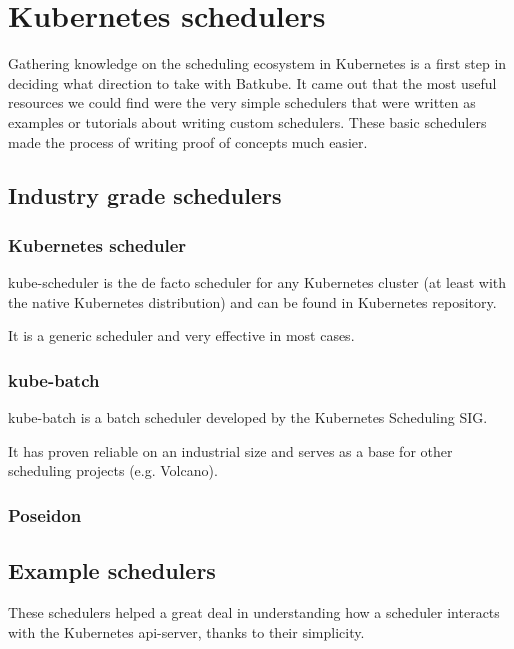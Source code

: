 \documentclass[12pt]{report}
\begin{document}
\section{Kubernetes schedulers}

Gathering knowledge on the scheduling ecosystem in Kubernetes is a first step
in deciding what direction to take with Batkube. It came out that the most
useful resources we could find were the very simple schedulers that were
written as examples or tutorials about writing custom schedulers. These basic
schedulers made the process of writing proof of concepts much easier.


\subsection{Industry grade schedulers}

\subsubsection{Kubernetes scheduler}

kube-scheduler is the de facto scheduler for any Kubernetes
cluster (at least with the native Kubernetes distribution) and can be found in
Kubernetes repository\cite{kube-repo}.

It is a generic scheduler and very effective in most cases.

\subsubsection{kube-batch}

kube-batch\cite{kube-batch} is a batch scheduler developed by the Kubernetes
Scheduling SIG\cite{scheduling-sig}.

It has proven reliable on an industrial size and serves as a base for other scheduling projects (e.g. Volcano\cite{volcano}).

\subsubsection{Poseidon}

\subsection{Example schedulers}

These schedulers helped a great deal in understanding how a scheduler interacts
with the Kubernetes api-server, thanks to their simplicity.
\end{document}
